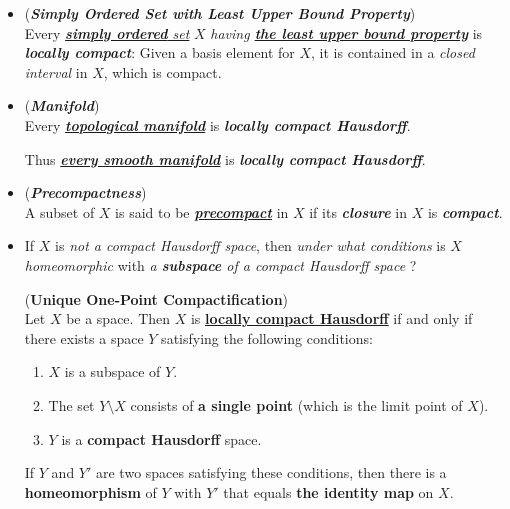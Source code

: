 \documentclass[11pt]{article}
\begin{document}
\begin{itemize}
\item \begin{example} (\emph{\textbf{Simply Ordered Set with Least Upper Bound Property}})\\
Every \underline{\emph{\textbf{simply ordered} set}} $X$ \emph{having \underline{\textbf{the least upper bound property}}} is \emph{\textbf{locally compact}}: Given a basis element for $X$, it is contained in a \emph{closed interval} in $X$, which is compact.
\end{example}

\item \begin{example} (\emph{\textbf{Manifold}}) \citep{lee2018introduction} \\
Every \underline{\emph{\textbf{topological manifold}}} is \emph{\textbf{locally compact Hausdorff}}.

Thus \underline{\emph{\textbf{every smooth manifold}}} is  \emph{\textbf{locally compact Hausdorff}}.
\end{example}


\item \begin{definition} (\emph{\textbf{Precompactness}})\\
A subset of $X$ is said to be \underline{\emph{\textbf{precompact}}} in $X$ if its \emph{\textbf{closure}} in $X$ is \emph{\textbf{compact}}.
\end{definition}

\item If $X$ is \emph{not a compact Hausdorff space}, then \emph{under what conditions} is $X$ \emph{homeomorphic} with \emph{a \textbf{subspace} of a compact Hausdorff space} ?

\begin{theorem} (\textbf{Unique One-Point Compactification}) \citep{munkres2000topology}\\
Let $X$ be a space. Then $X$ is \underline{\textbf{locally compact Hausdorff}} if and only if there exists a space $Y$ satisfying the following conditions:
\begin{enumerate}
\item $X$ is a subspace of $Y$.
\item The set $Y \setminus X$ consists of \textbf{a single point} (which is the limit point of $X$).
\item $Y$ is a \textbf{compact Hausdorff} space.
\end{enumerate} 
If $Y$ and $Y'$ are two spaces satisfying these conditions, then there is a \textbf{homeomorphism} of $Y$ with $Y'$ that equals \textbf{the identity map} on $X$.
\end{theorem}


\end{itemize}
\end{document}
